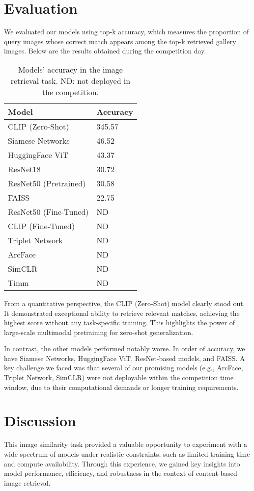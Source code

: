 \documentclass[10pt,twocolumn,letterpaper]{article}
\begin{document}
\section{Evaluation}
We evaluated our models using top-k accuracy, which measures the proportion of query images whose correct match appears among the top-k retrieved gallery images. Below are the results obtained during the competition day.

\begin{table}[ht]
\centering
\caption{Models' accuracy in the image retrieval task. ND: not deployed in the competition.}
\begin{tabular}{ll}
\toprule
\textbf{Model} & \textbf{Accuracy} \\
\midrule
CLIP (Zero-Shot) & 345.57 \\
Siamese Networks & 46.52 \\
HuggingFace ViT & 43.37 \\
ResNet18 & 30.72 \\
ResNet50 (Pretrained) & 30.58 \\
FAISS & 22.75 \\
ResNet50 (Fine-Tuned) & ND \\
CLIP (Fine-Tuned) & ND \\
Triplet Network & ND \\
ArcFace & ND \\
SimCLR & ND \\
Timm & ND \\
\bottomrule
\end{tabular}
\end{table}

From a quantitative perspective, the CLIP (Zero-Shot) model clearly stood out. It demonstrated exceptional ability to retrieve relevant matches, achieving the highest score without any task-specific training. This highlights the power of large-scale multimodal pretraining for zero-shot generalization.

In contrast, the other models performed notably worse. In order of accuracy, we have Siamese Networks, HuggingFace ViT, ResNet-based models, and FAISS. A key challenge we faced was that several of our promising models (e.g., ArcFace, Triplet Network, SimCLR) were not deployable within the competition time window, due to their computational demands or longer training requirements.

\section{Discussion}
This image similarity task provided a valuable opportunity to experiment with a wide spectrum of models under realistic constraints, such as limited training time and compute availability. Through this experience, we gained key insights into model performance, efficiency, and robustness in the context of content-based image retrieval.
\end{document}
